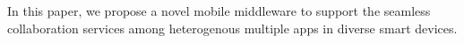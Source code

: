 \documentclass{sig-alternate}
\begin{document}
%
%
%
%
%
In this paper, we propose a novel mobile middleware to support the seamless collaboration services among heterogenous multiple apps in diverse smart devices.
\end{document}
